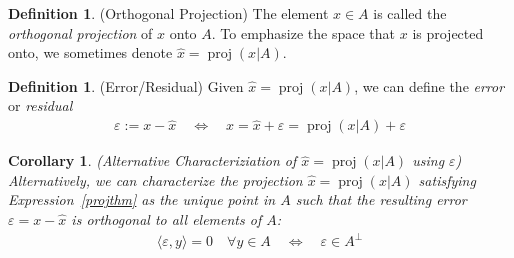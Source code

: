 \documentclass[12pt]{article}
\numberwithin{equation}{section} %
\theoremstyle{plain}
\newtheorem{cor}[thm]{Corollary}
\theoremstyle{definition}
\newtheorem{defn}[thm]{Definition}
\theoremstyle{remark}
\newcommand{\proj}{\operatorname{proj}}
\begin{document}
\begin{defn}(Orthogonal Projection)
The element $\hat{x}\in A$ is called the \emph{orthogonal projection} of
$x$ onto $A$. To emphasize the space that $x$ is projected onto, we
sometimes denote $\hat{x}=\proj(x|A)$.
\end{defn}

\begin{defn}(Error/Residual)
Given $\hat{x}=\proj(x|A)$, we can define the \emph{error} or
\emph{residual}
\begin{align*}
  \varepsilon:=x-\hat{x}
  \quad\iff\quad
  x=\hat{x}+\varepsilon=\proj(x|A)+\varepsilon
\end{align*}
\end{defn}

\begin{cor}
\emph{(Alternative Characteriziation of $\hat{x}=\proj(x|A)$ using
$\varepsilon$)}
Alternatively, we can characterize the projection $\hat{x}=\proj(x|A)$
satisfying Expression~\ref{projthm} as the unique point in $A$ such that
the resulting error $\varepsilon=x-\hat{x}$ is orthogonal to all
elements of $A$:
\begin{align*}
  \langle \varepsilon, y\rangle =0
  \quad\forall y\in A
  \quad\iff\quad
  \varepsilon\in A^\perp
\end{align*}
\end{cor}
\end{document}
